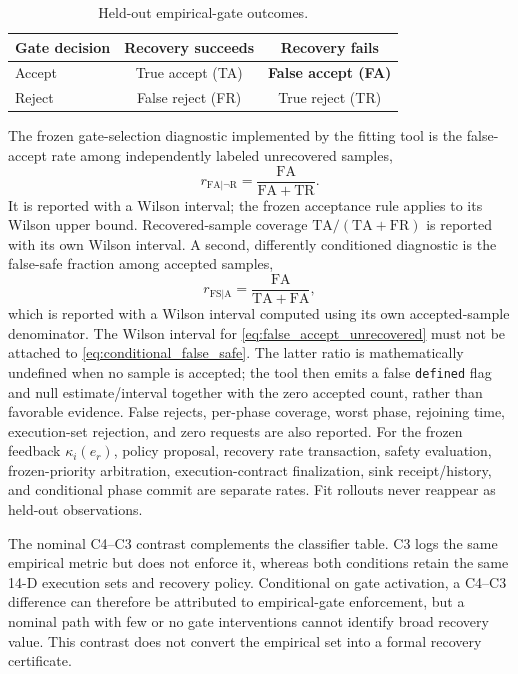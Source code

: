 \begin{table}[t]
  \centering
  \caption{Held-out empirical-gate outcomes.}
  \label{tab:gate_confusion}
  \small
  \begin{tabular}{@{}lcc@{}}
    \toprule
    Gate decision & Recovery succeeds & Recovery fails \\
    \midrule
    Accept & True accept (TA) & \textbf{False accept (FA)} \\
    Reject & False reject (FR) & True reject (TR) \\
    \bottomrule
  \end{tabular}
\end{table}

The frozen gate-selection diagnostic implemented by the fitting tool is the
false-accept rate among independently labeled unrecovered samples,
\begin{equation}
  r_{\mathrm{FA}|\neg\mathrm{R}}
  =\frac{\mathrm{FA}}{\mathrm{FA}+\mathrm{TR}}.
  \label{eq:false_accept_unrecovered}
\end{equation}
It is reported with a Wilson interval; the frozen acceptance rule applies to
its Wilson upper bound.  Recovered-sample coverage
$\mathrm{TA}/(\mathrm{TA}+\mathrm{FR})$ is reported with its own Wilson
interval.  A second, differently conditioned diagnostic is the false-safe
fraction among accepted samples,
\begin{equation}
  r_{\mathrm{FS}|\mathrm{A}}
  =\frac{\mathrm{FA}}{\mathrm{TA}+\mathrm{FA}},
  \label{eq:conditional_false_safe}
\end{equation}
which is reported with a Wilson interval computed using its own accepted-sample
denominator.  The Wilson interval for
\eqref{eq:false_accept_unrecovered} must not be attached to
\eqref{eq:conditional_false_safe}.  The latter ratio is mathematically
undefined when no sample is accepted; the tool then emits a false
\texttt{defined} flag and null estimate/interval together with the zero
accepted count, rather than favorable evidence.  False rejects,
per-phase coverage, worst phase, rejoining time, execution-set rejection, and
zero requests are also reported.  For the frozen feedback $\kappa_i(e_r)$,
policy proposal, recovery rate transaction, safety evaluation, frozen-priority
arbitration, execution-contract finalization, sink receipt/history, and
conditional phase commit are separate rates.  Fit rollouts never reappear as
held-out observations.

The nominal C4--C3 contrast complements the classifier table.  C3 logs the same
empirical metric but does not enforce it, whereas both conditions retain the
same 14-D execution sets and recovery policy.  Conditional on gate activation,
a C4--C3 difference can therefore be attributed to empirical-gate enforcement,
but a nominal path with few or no gate interventions cannot identify broad
recovery value.  This contrast does not convert the empirical set into a formal
recovery certificate.


